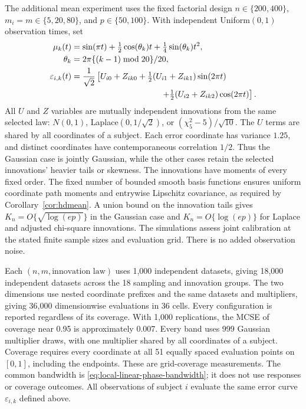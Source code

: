 The additional mean experiment uses the fixed factorial design
$n\in\{200,400\}$, $m_i=m\in\{5,20,80\}$, and $p\in\{50,100\}$.
With independent Uniform$(0,1)$ observation times,
set
\[
\begin{aligned}
\mu_k(t)&=\sin(\pi t)+\tfrac12\cos(\theta_k)t
+\tfrac14\sin(\theta_k)t^2,\\
\theta_k&=2\pi\{(k-1)\bmod20\}/20,\\
\varepsilon_{i,k}(t)&=\frac1{\sqrt2}\left[
U_{i0}+Z_{ik0}+\tfrac12(U_{i1}+Z_{ik1})\sin(2\pi t)\right.\\
&\hspace{38mm}\left.+\tfrac12(U_{i2}+Z_{ik2})\cos(2\pi t)\right].
\end{aligned}
\]
All $U$ and $Z$ variables are mutually independent innovations from the
same selected law: $N(0,1)$, Laplace$(0,1/\sqrt2)$, or
$(\chi^2_5-5)/\sqrt{10}$. The $U$ terms are shared by all coordinates of a
subject. Each error coordinate has variance $1.25$, and distinct
coordinates have contemporaneous correlation $1/2$. Thus the Gaussian
case is jointly Gaussian, while the other cases retain the selected
innovations' heavier tails or skewness. The innovations have moments
of every fixed order. The fixed number of bounded smooth basis
functions ensures uniform coordinate path moments and entrywise
Lipschitz covariance, as required by Corollary~\ref{cor:hdmean}.
A union bound on the innovation tails gives
$K_n=O\{\sqrt{\log(ep)}\}$ in the Gaussian case and
$K_n=O\{\log(ep)\}$ for Laplace and adjusted chi-square innovations.
The simulations assess joint calibration at the stated finite sample
sizes and evaluation grid. There is no added observation noise.

Each $(n,m,\text{innovation law})$ uses 1,000 independent datasets,
giving 18,000 independent datasets across the 18 sampling and innovation
groups. The two dimensions use nested coordinate prefixes and the same
datasets and multipliers, giving 36,000 dimensionwise evaluations in
36 cells. Every configuration is reported regardless of its coverage.
With 1,000 replications, the MCSE of coverage near 0.95 is approximately 0.007.
Every band uses
999 Gaussian multiplier draws, with one multiplier shared by all
coordinates of a subject. Coverage requires every coordinate at all 51
equally spaced evaluation points on $[0,1]$, including the endpoints.
These are grid-coverage measurements. The common bandwidth is
\eqref{eq:local-linear-phase-bandwidth}; it does not use responses
or coverage outcomes. All observations of subject $i$ evaluate the
same error curve $\varepsilon_{i,k}$ defined above.

